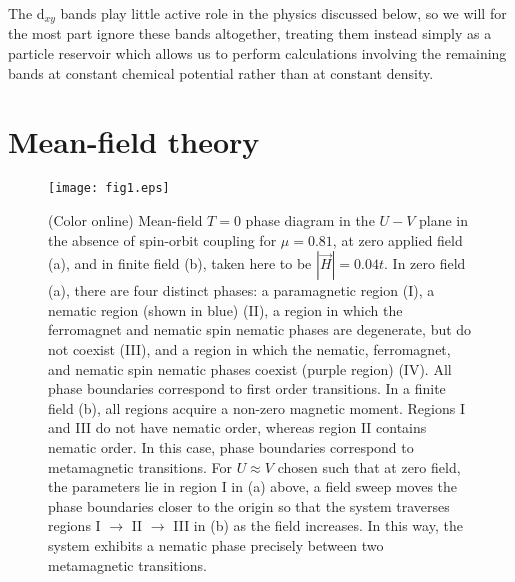 \documentclass[prb,aps,amssymb,showpacs,twocolumn,amsmath,floatfix]{revtex4}
\begin{document}
  The d$_{xy}$ 
 bands play little active role in the physics discussed below, so we will for the most part ignore 
 these bands altogether, treating them instead simply as a particle reservoir which allows us to 
 perform calculations involving the remaining bands at constant chemical potential rather than 
 at constant density.

  
 
\section{Mean-field theory}
\label{meanfield}

\begin{figure}
\texttt{[image: fig1.eps]}
\caption{ (Color online) Mean-field $T=0$ phase diagram in the $U- V$ plane in the absence 
of spin-orbit coupling for  $\mu = 0.81$, at zero 
applied field (a), and in finite field (b), taken here to be $|\vec H|=0.04t$.  
In zero field (a), there are four distinct phases: a paramagnetic region (I), a nematic region (shown in blue) (II), 
a region in which the ferromagnet and nematic spin nematic phases are degenerate, but do not 
coexist (III), and a region in which the nematic, ferromagnet, and nematic spin nematic phases coexist 
(purple region) (IV).  All phase boundaries correspond to first order transitions.  In a finite field (b), all regions acquire a non-zero magnetic moment.  Regions I and III do not 
have nematic order, whereas region II contains nematic order.  In this case, phase boundaries 
correspond to metamagnetic transitions.  For $U \approx V$ chosen such that at zero field, the parameters lie in region I in (a) above, a field sweep moves the phase boundaries closer to the origin so that the system traverses regions I $\rightarrow$ II $\rightarrow$ III  in (b) as the field increases.  In this way, the system exhibits a nematic phase precisely between two metamagnetic transitions.      }
   \label{phasediagram}
\end{figure} 
\end{document}
